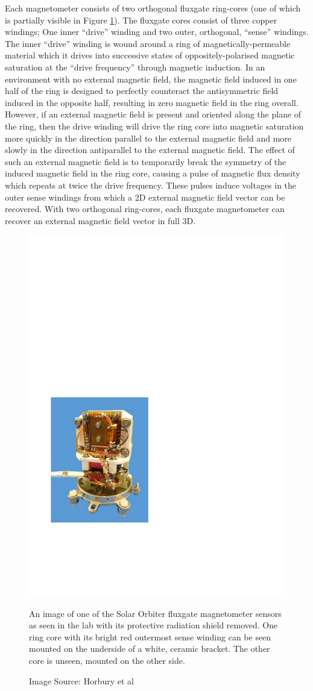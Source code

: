 Each magnetometer consists of two orthogonal fluxgate ring-cores (one of which is partially visible in Figure \ref{fig: magnetomato}). The fluxgate cores consist of three copper windings; One inner “drive” winding and two outer, orthogonal, “sense” windings. The inner “drive” winding is wound around a ring of magnetically-permeable material which it drives into successive states of oppositely-polarised magnetic saturation at the “drive frequency” through magnetic induction. In an environment with no external magnetic field, the magnetic field induced in one half of the ring is designed to perfectly counteract the antisymmetric field induced in the opposite half, resulting in zero magnetic field in the ring overall. However, if an external magnetic field is present and oriented along the plane of the ring, then the drive winding will drive the ring core into magnetic saturation more quickly in the direction parallel to the external magnetic field and more slowly in the direction antiparallel to the external magnetic field. The effect of such an external magnetic field is to temporarily break the symmetry of the induced magnetic field in the ring core, causing a pulse of magnetic flux density which repeats at twice the drive frequency. These pulses induce voltages in the outer sense windings from which a 2D external magnetic field vector can be recovered. With two orthogonal ring-cores, each fluxgate magnetometer can recover an external magnetic field vector in full 3D\cite{horbury2020}\cite{dickson2024}. 
\\

\begin{figure}[h!]
    \centering
    \includegraphics[width=0.5\linewidth]{figures/magnetomato.pdf}
    \caption{An image of one of the Solar Orbiter fluxgate magnetometer sensors as seen in the lab with its protective radiation shield removed\cite{horbury2020}. One ring core with its bright red outermost sense winding can be seen mounted on the underside of a white, ceramic bracket. The other core is unseen, mounted on the other side.}
    \caption*{Image Source: Horbury et al\cite{horbury2020}}
    \label{fig: magnetomato}
\end{figure}


